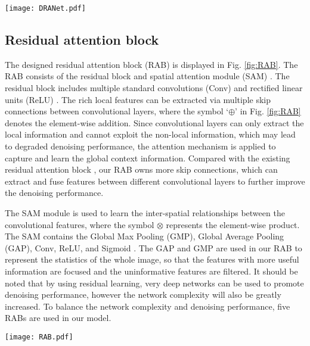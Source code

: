 \documentclass[3p,times]{elsarticle}
\begin{document}
\begin{figure*}[htbp]
	\begin{center}
		\texttt{[image: DRANet.pdf]}
		\caption{The network architecture of the DRANet for image denoising.}
		\label{fig:DRANet}
	\end{center}
\end{figure*}

\subsection{Residual attention block}
The designed residual attention block (RAB) is displayed in Fig. \ref{fig:RAB}. The RAB consists of the residual block and spatial attention module (SAM) \cite{Woo2018}. The residual block includes multiple standard convolutions (Conv) and rectified linear units (ReLU) \cite{Krizhevsky2012}. The rich local features can be extracted via multiple skip connections between convolutional layers, where the symbol `$\oplus$' in Fig. \ref{fig:RAB} denotes the element-wise addition. Since convolutional layers can only extract the local information and cannot exploit the non-local information, which may lead to degraded denoising performance, the attention mechanism is applied to capture and learn the global context information. Compared with the existing residual attention block \cite{Hou2019, Zhang2019}, our RAB owns more skip connections, which can extract and fuse features between different convolutional layers to further improve the denoising performance.

The SAM module is used to learn the inter-spatial relationships between the convolutional features, where the symbol $\otimes$ represents the element-wise product. The SAM contains the Global Max Pooling (GMP), Global Average Pooling (GAP), Conv, ReLU, and Sigmoid \cite{Han1995}. The GAP and GMP are used in our RAB to represent the statistics of the whole image, so that the features with more useful information are focused and the uninformative features are filtered. It should be noted that by using residual learning, very deep networks can be used to promote denoising performance, however the network complexity will also be greatly increased. To balance the network complexity and denoising performance, five RABs are used in our model.

\begin{figure*}[htbp]
	\begin{center}
		\texttt{[image: RAB.pdf]}
		\caption{The architecture of the residual attention block (RAB).}
		\label{fig:RAB}
	\end{center}
\end{figure*}
\end{document}
